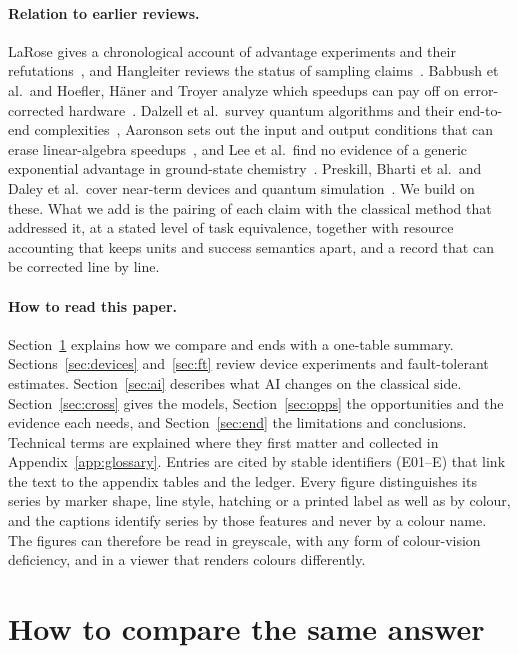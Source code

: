 \documentclass[10pt,a4paper]{article}
\begin{document}
\paragraph{Relation to earlier reviews.} LaRose gives a chronological account of advantage experiments and their refutations~\cite{larose2026}, and Hangleiter reviews the status of sampling claims~\cite{hangleiter2026}. Babbush et al.\ and Hoefler, H\"aner and Troyer analyze which speedups can pay off on error-corrected hardware~\cite{babbush2021,hoefler2023}. Dalzell et al.\ survey quantum algorithms and their end-to-end complexities~\cite{dalzell2023}, Aaronson sets out the input and output conditions that can erase linear-algebra speedups~\cite{aaronson2015}, and Lee et al.\ find no evidence of a generic exponential advantage in ground-state chemistry~\cite{lee2023}. Preskill, Bharti et al.\ and Daley et al.\ cover near-term devices and quantum simulation~\cite{preskill2018,bharti2022,daley2022}. We build on these. What we add is the pairing of each claim with the classical method that addressed it, at a stated level of task equivalence, together with resource accounting that keeps units and success semantics apart, and a record that can be corrected line by line.

\paragraph{How to read this paper.} Section~\ref{sec:compare} explains how we compare and ends with a one-table summary. Sections~\ref{sec:devices} and~\ref{sec:ft} review device experiments and fault-tolerant estimates. Section~\ref{sec:ai} describes what AI changes on the classical side. Section~\ref{sec:cross} gives the models, Section~\ref{sec:opps} the opportunities and the evidence each needs, and Section~\ref{sec:end} the limitations and conclusions. Technical terms are explained where they first matter and collected in Appendix~\ref{app:glossary}. Entries are cited by stable identifiers (E01--E\nEntries) that link the text to the appendix tables and the ledger. Every figure distinguishes its series by marker shape, line style, hatching or a printed label as well as by colour, and the captions identify series by those features and never by a colour name. The figures can therefore be read in greyscale, with any form of colour-vision deficiency, and in a viewer that renders colours differently.
\section{How to compare the same answer}
\label{sec:compare}
\end{document}
